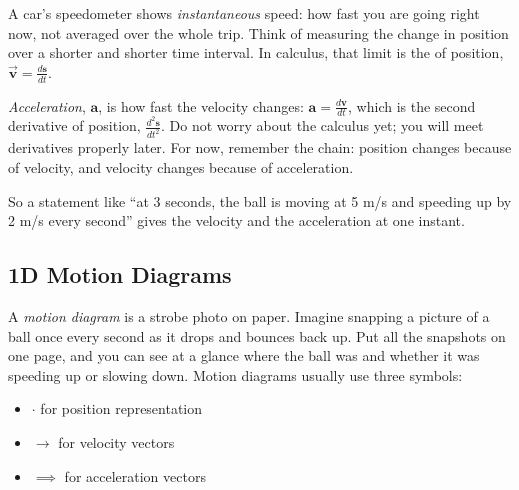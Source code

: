 A car's speedometer shows \emph{instantaneous} speed: how fast you are going right now, not averaged over the whole trip. Think of measuring the change in position over a shorter and shorter time interval. In calculus, that limit is the  of position, $\vec{\mathbf{v}} = \tfrac{d\mathbf{s}}{dt}$.

\emph{Acceleration}, $\mathbf a$, is how fast the velocity changes: $\mathbf a = \tfrac{d\mathbf v}{dt}$, which is the second derivative of position, $\tfrac{d^2\mathbf s}{dt^2}$. Do not worry about the calculus yet; you will meet derivatives properly later. For now, remember the chain: position changes because of velocity, and velocity changes because of acceleration.

So a statement like ``at 3 seconds, the ball is moving at 5 m/s and speeding up by 2 m/s every second'' gives the velocity and the acceleration at one instant.

\subsection{1D Motion Diagrams}
A \emph{motion diagram} is a strobe photo on paper. Imagine snapping a picture of a ball once every second as it drops and bounces back up. Put all the snapshots on one page, and you can see at a glance where the ball was and whether it was speeding up or slowing down. Motion diagrams usually use three symbols:
\begin{itemize}
    \item $\cdot$ for position representation
    \item $\rightarrow$ for velocity vectors
    \item $\implies$ for acceleration vectors
\end{itemize}

